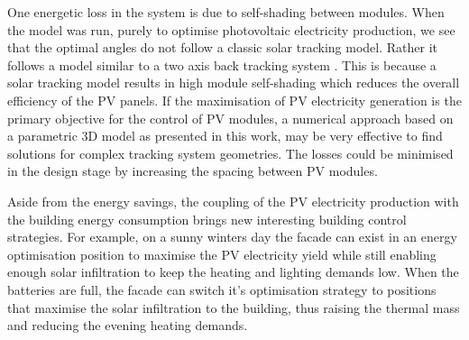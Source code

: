 
One energetic loss in the system is due to self-shading between modules. When the model was run, purely to optimise photovoltaic electricity production, we see that the optimal angles do not follow a classic solar tracking model. Rather it follows a model similar to a two axis back tracking system \cite{lorenzo2011tracking}. This is because a solar tracking model results in high module self-shading which reduces the overall efficiency of the PV panels. If the maximisation of PV electricity generation is the primary objective for the control of PV modules, a numerical approach based on a parametric 3D model as presented in this work, may be very effective to find solutions for complex tracking system geometries. The losses could be minimised in the design stage by increasing the spacing between PV modules.

Aside from the energy savings, the coupling of the PV electricity production with the building energy consumption brings new interesting building control strategies. For example, on a sunny winters day the facade can exist in an energy optimisation position to maximise the PV electricity yield while still enabling enough solar infiltration to keep the heating and lighting demands low. When the batteries are full, the facade can switch it's optimisation strategy to positions that maximise the solar infiltration to the building, thus raising the thermal mass and reducing the evening heating demands. 






